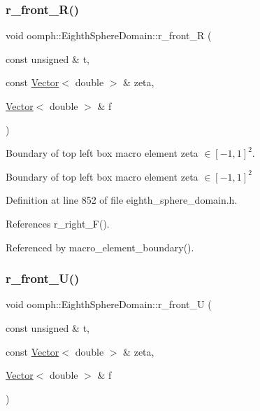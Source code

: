 \subsubsection{\texorpdfstring{r\+\_\+front\+\_\+\+R()}{r\_front\_R()}}
{\footnotesize\ttfamily void oomph\+::\+Eighth\+Sphere\+Domain\+::r\+\_\+front\+\_\+R (\begin{DoxyParamCaption}\item[{const unsigned \&}]{t,  }\item[{const \hyperlink{classoomph_1_1Vector}{Vector}$<$ double $>$ \&}]{zeta,  }\item[{\hyperlink{classoomph_1_1Vector}{Vector}$<$ double $>$ \&}]{f }\end{DoxyParamCaption})\hspace{0.3cm}{\ttfamily [private]}}



Boundary of top left box macro element zeta $ \in [-1,1]^2 $. 

Boundary of top left box macro element zeta $ \in [-1,1]^2 $ 

Definition at line 852 of file eighth\+\_\+sphere\+\_\+domain.\+h.



References r\+\_\+right\+\_\+\+F().



Referenced by macro\+\_\+element\+\_\+boundary().

\mbox{\label{classoomph_1_1EighthSphereDomain_aef12fa8f21592009e8ab51d88c301388}} 
\subsubsection{\texorpdfstring{r\+\_\+front\+\_\+\+U()}{r\_front\_U()}}
{\footnotesize\ttfamily void oomph\+::\+Eighth\+Sphere\+Domain\+::r\+\_\+front\+\_\+U (\begin{DoxyParamCaption}\item[{const unsigned \&}]{t,  }\item[{const \hyperlink{classoomph_1_1Vector}{Vector}$<$ double $>$ \&}]{zeta,  }\item[{\hyperlink{classoomph_1_1Vector}{Vector}$<$ double $>$ \&}]{f }\end{DoxyParamCaption})\hspace{0.3cm}{\ttfamily [private]}}



